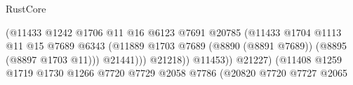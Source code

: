 \begin{lexlean}{RustCore}
\begin{coremodule}
                                                                  (@11433
                                                                    @1242
                                                                    @1706
                                                                    @11
                                                                    @16
                                                                    @6123
                                                                    @7691
                                                                    @20785
                                                                    (@11433
                                                                      @1704
                                                                      @1113
                                                                      @11
                                                                      @15
                                                                      @7689
                                                                      @6343
                                                                      (@11889
                                                                        @1703
                                                                        @7689
                                                                        (@8890 (@8891 @7689))
                                                                        (@8895 (@8897 @1703 @11)))
                                                                      @21441)))
                                                                @21218))
                                                            @11453))
                                                        @21227)
                                                      (@11408
                                                        @1259
                                                        @1719
                                                        @1730
                                                        @1266
                                                        @7720
                                                        @7729
                                                        @2058
                                                        @7786
                                                        (@20820
                                                          @7720
                                                          @7727
                                                          @2065

\end{coremodule}
\end{lexlean}

